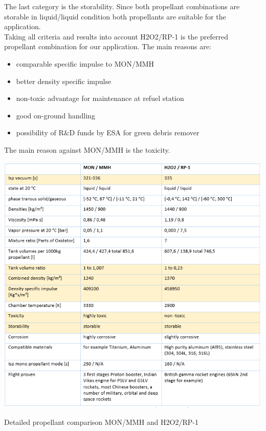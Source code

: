 The last category is the storability. Since both propellant combinations are storable in liquid/liquid condition both propellants are suitable for the application.\\
\clearpage
Taking all criteria and results into account H2O2/RP-1 is the preferred propellant combination for our application. The main reasons are:
\vspace{-20pt}
\begin{itemize}
	\itemsep0em
	\item	comparable specific impulse to MON/MMH
	\item	better density specific impulse
	\item	non-toxic advantage for maintenance at refuel station
	\item	good on-ground handling
	\item	possibility of R\&D funds by ESA for green debris remover	
\end{itemize}
\vspace{-20pt}
The main reason against MON/MMH is the toxicity.
\vspace{-20pt}
\begin{table}
	\centering\includegraphics[width=\linewidth]{detailedcompprop}
	\caption{Detailed propellant comparison MON/MMH and H2O2/RP-1}\label{tab2}
\end{table}
